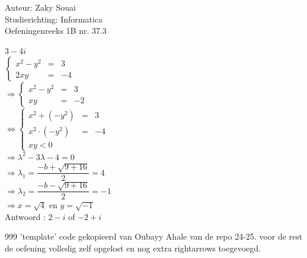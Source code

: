 \documentclass[a4paper]{article}
\begin{document}
  
\noindent \large Auteur: Zaky Souai \\
\noindent \large Studierichting:  Informatica\\
\noindent \large Oefeningenreeks 1B nr. 37.3\\

\bigskip

\normalsize

$ 3 - 4i $\\

$\left\{
    \begin{array}{lll} 
        x^2 - y^2 &=& 3 \\
        2xy &=& -4
    \end{array}
\right .$\\

$\Rightarrow \left\{
    \begin{array}{lll} 
        x^2 - y^2 &=& 3 \\
        xy &=& -2
    \end{array}
\right .$\\

$\Leftrightarrow \left\{
    \begin{array}{lll} 
        x^2 + (-y^2) &=& 3 \\
        x^2 \cdot (-y^2) &=& -4 \\
        xy < 0
    \end{array}
\right .$\\

$\Rightarrow \lambda^2 - 3\lambda - 4 = 0 $ \\

$\Rightarrow \lambda_1 = \dfrac{-b + \sqrt{9 + 16}}{2} = 4 $\\

$\Rightarrow \lambda_2 = \dfrac{-b - \sqrt{9 + 16}}{2} = -1  $\\

$\Rightarrow x = \sqrt{4} $ en $ y = \sqrt{-1} $\\

Antwoord : $ 2 - i $ of $ -2 + i $





\begin{thebibliography}{999}
'template' code gekopieerd van Oubayy Ahale van de repo 24-25.
voor de rest de oefening volledig zelf opgelost en nog extra rightarrows toegevoegd.
\end{thebibliography}
\end{document}

